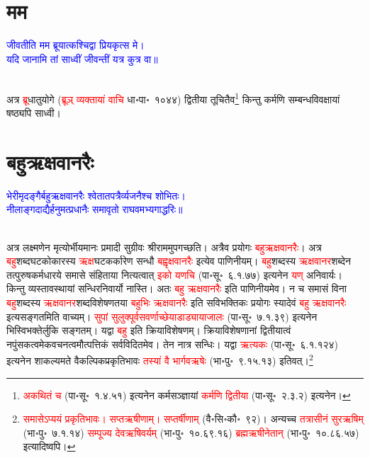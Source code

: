 \section[मम]{मम}
\centering\textcolor{blue}{जीवतीति मम ब्रूयात्कश्चिद्वा प्रियकृत्स मे।\nopagebreak\\
यदि जानामि तां साध्वीं जीवन्तीं यत्र कुत्र वा॥}\nopagebreak\\
\\
\begin{sloppypar}\justifying\noindent\hspace{10mm} अत्र \textcolor{red}{ब्रू}\-धातु\-योगे (\textcolor{red}{ब्रूञ् व्यक्तायां वाचि} धा॰पा॰~१०४४) द्वितीया तूचितैव\footnote{\textcolor{red}{अकथितं च} (पा॰सू॰~१.४.५१) इत्यनेन कर्म\-सञ्ज्ञायां \textcolor{red}{कर्मणि द्वितीया} (पा॰सू॰~२.३.२) इत्यनेन।} किन्तु कर्मणि सम्बन्ध\-विवक्षायां षष्ठ्यपि साध्वी।\end{sloppypar}
\section[बहुऋक्षवानरैः]{बहुऋक्षवानरैः}
\centering\textcolor{blue}{भेरीमृदङ्गैर्बहुऋक्षवानरैः श्वेतातपत्रैर्व्यजनैश्च शोभितः।\nopagebreak\\
नीलाङ्गदाद्यैर्हनुमत्प्रधानैः समावृतो राघवमभ्यगाद्धरिः॥}\nopagebreak\\
\\
\begin{sloppypar}\justifying\noindent\hspace{10mm} अत्र 
लक्ष्मणेन मृत्योर्भीयमानः प्रमादी सुग्रीवः श्रीराममुपगच्छति। अत्रैव प्रयोगः \textcolor{red}{बहुऋक्षवानरैः}। अत्र \textcolor{red}{बहु}\-शब्द\-घटकोकारस्य \textcolor{red}{ऋक्ष}\-घटकर्कारेण सन्धौ \textcolor{red}{बह्वृक्ष\-वानरैः} इत्येव पाणिनीयम्। \textcolor{red}{बहु}\-शब्दस्य \textcolor{red}{ऋक्ष\-वानर}\-शब्देन तत्पुरुष\-कर्मधारये समासे संहिताया नित्यत्वात् \textcolor{red}{इको यणचि} (पा॰सू॰~६.१.७७) इत्यनेन \textcolor{red}{यण्‌} अनिवार्यः। किन्तु व्यस्तावस्थायां सन्धिरनिवार्यो नास्ति। अतः \textcolor{red}{बहु ऋक्षवानरैः} इति पाणिनीयमेव। न च समासं विना \textcolor{red}{बहु}\-शब्दस्य \textcolor{red}{ऋक्ष\-वानर}\-शब्द\-विशेषणतया \textcolor{red}{बहुभिः ऋक्ष\-वानरैः} इति सविभक्तिकः प्रयोगः स्यादेवं \textcolor{red}{बहु ऋक्ष\-वानरैः} इत्यसङ्गतमिति वाच्यम्। \textcolor{red}{सुपां सुलुक्पूर्व\-सवर्णाच्छेयाडाड्यायाजालः} (पा॰सू॰~७.१.३९) इत्यनेन भिस्विभक्तेर्लुकि सङ्गतम्। यद्वा \textcolor{red}{बहु} इति क्रियाविशेषणम्। क्रिया\-विशेषणानां द्वितीयात्वं नपुंसकत्वमेक\-वचनत्वमौत्पत्तिकं सर्व\-विदितमेव। तेन नात्र सन्धिः। यद्वा \textcolor{red}{ऋत्यकः} (पा॰सू॰~६.१.१२४) इत्यनेन शाकल्यमते वैकल्पिक\-प्रकृतिभावः \textcolor{red}{तस्यां वै भार्गवऋषेः} (भा॰पु॰~९.१५.१३) इतिवत्।\footnote{\textcolor{red}{समासेऽप्ययं प्रकृतिभावः। सप्तऋषीणाम्। सप्तर्षीणाम्} (वै॰सि॰कौ॰~९२)। अन्यच्च \textcolor{red}{तत्रासीनं सुरऋषिम्} (भा॰पु॰~७.१.१४) \textcolor{red}{सम्पूज्य देवऋषिवर्यम्} (भा॰पु॰~१०.६९.१६) \textcolor{red}{ब्रह्मऋषीनेतान्} (भा॰पु॰~१०.८६.५७) इत्यादिष्वपि।}\end{sloppypar}
